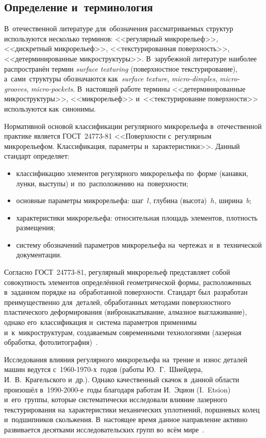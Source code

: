 \subsection{Определение и~терминология}

В~отечественной литературе для~обозначения рассматриваемых структур используются несколько терминов: <<регулярный микрорельеф>>, <<дискретный микрорельеф>>, <<текстурированная поверхность>>, <<детерминированные микроструктуры>>. В~зарубежной литературе наиболее распространён термин \textit{surface texturing} (поверхностное текстурирование), а~сами~структуры обозначаются как~\textit{surface texture}, \textit{micro-dimples}, \textit{micro-grooves}, \textit{micro-pockets}. В~настоящей работе термины <<детерминированные микроструктуры>>, <<микрорельеф>> и~<<текстурирование поверхности>> используются как~синонимы.

Нормативной основой классификации регулярного микрорельефа в~отечественной практике является ГОСТ~24773-81 <<Поверхности с~регулярным микрорельефом. Классификация, параметры и~характеристики>>. Данный стандарт определяет:
\begin{itemize}
\item классификацию элементов регулярного микрорельефа по~форме (канавки, лунки, выступы) и~по~расположению на~поверхности;
\item основные параметры микрорельефа: шаг~$l$, глубина (высота)~$h$, ширина~$b$;
\item характеристики микрорельефа: относительная площадь элементов, плотность размещения;
\item систему обозначений параметров микрорельефа на~чертежах и~в~технической документации.
\end{itemize}

Согласно ГОСТ~24773-81, регулярный микрорельеф представляет собой совокупность элементов определённой геометрической формы, расположенных в~заданном порядке на~обработанной поверхности. Стандарт был~разработан преимущественно для~деталей, обработанных методами поверхностного пластического деформирования (вибронакатывание, алмазное выглаживание), однако его~классификация и~система параметров применимы и~к~микроструктурам, создаваемым современными технологиями (лазерная обработка, фотолитография)~\cite{bashmur2021,bashmur2023b}.

Исследования влияния регулярного микрорельефа на~трение и~износ деталей машин ведутся с~1960-1970-х~годов (работы Ю.~Г.~Шнейдера, И.~В.~Крагельского и~др.). Однако качественный скачок в~данной области произошёл в~1990-2000-е~годы благодаря работам И.~Эцион (I.~Etsion) и~его~группы, которые систематически исследовали влияние лазерного текстурирования на~характеристики механических уплотнений, поршневых колец и~подшипников скольжения. В~настоящее время данное направление активно развивается десятками исследовательских групп во~всём мире~\cite{senatore2018,joshi2018,vladescu2019}.

